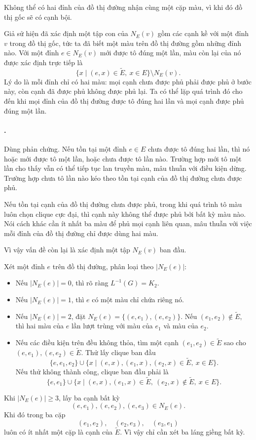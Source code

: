 \documentclass[11pt]{article}
\begin{document}
Không thể có hai đỉnh của đồ thị đường nhận cùng một cặp màu, vì khi đó đồ thị
gốc sẽ có cạnh bội.

Giả sử hiện đã xác định một tập con của \(N_E(v)\) gồm các cạnh kề với một
đỉnh \(v\) trong đồ thị gốc, tức ta đã biết một màu trên đồ thị đường gồm những
đỉnh nào. Với một đỉnh \(e\in N_E(v)\) mới được tô đúng một lần, màu còn lại
của nó được xác định trực tiếp là
\[
  \{x\mid (e,x)\in \widetilde E,\ x\in E\}\setminus N_E(v).
\]
Lý do là mỗi đỉnh chỉ có hai màu: mọi cạnh chưa được phủ phải được phủ ở bước
này, còn cạnh đã được phủ không được phủ lại. Ta có thể lặp quá trình đó cho
đến khi mọi đỉnh của đồ thị đường được tô đúng hai lần và mọi cạnh được phủ
đúng một lần.

\paragraph{.}
Dùng phản chứng. Nếu tồn tại một đỉnh \(e\in E\) chưa được tô đúng hai lần,
thì nó hoặc mới được tô một lần, hoặc chưa được tô lần nào. Trường hợp mới tô
một lần cho thấy vẫn có thể tiếp tục lan truyền màu, mâu thuẫn với điều kiện
dừng. Trường hợp chưa tô lần nào kéo theo tồn tại cạnh của đồ thị đường chưa
được phủ.

Nếu tồn tại cạnh của đồ thị đường chưa được phủ, trong khi quá trình tô màu
luôn chọn clique cực đại, thì cạnh này không thể được phủ bởi bất kỳ màu nào.
Nói cách khác cần ít nhất ba màu để phủ mọi cạnh liên quan, mâu thuẫn với việc
mỗi đỉnh của đồ thị đường chỉ được dùng hai màu.

Vì vậy vấn đề còn lại là xác định một tập \(N_E(v)\) ban đầu.

Xét một đỉnh \(e\) trên đồ thị đường, phân loại theo \(|N_E(e)|\):
\begin{itemize}
  \item Nếu \(|N_E(e)|=0\), thì rõ ràng \(L^{-1}(G)=K_2\).
  \item Nếu \(|N_E(e)|=1\), thì \(e\) có một màu chỉ chứa riêng nó.
  \item Nếu \(|N_E(e)|=2\), đặt \(N_E(e)=\{(e,e_1),(e,e_2)\}\). Nếu
  \((e_1,e_2)\notin \widetilde E\), thì hai màu của \(e\) lần lượt trùng với
  màu của \(e_1\) và màu của \(e_2\).
  \item Nếu các điều kiện trên đều không thỏa, tìm một cạnh
  \((e_1,e_2)\in \widetilde E\) sao cho
  \((e,e_1),(e,e_2)\in \widetilde E\). Thử lấy clique ban đầu
  \[
    \{e,e_1,e_2\}\cup
    \{x\mid (e,x),(e_1,x),(e_2,x)\in \widetilde E,\ x\in E\}.
  \]
  Nếu thử không thành công, clique ban đầu phải là
  \[
    \{e,e_1\}\cup
    \{x\mid (e,x),(e_1,x)\in \widetilde E,\ (e_2,x)\notin\widetilde E,\ x\in E\}.
  \]
\end{itemize}
Khi \(|N_E(e)|\ge 3\), lấy ba cạnh bất kỳ
\[
  (e,e_1),(e,e_2),(e,e_3)\in N_E(e).
\]
Khi đó trong ba cặp
\[
  (e_1,e_2),\quad (e_2,e_3),\quad (e_3,e_1)
\]
luôn có ít nhất một cặp là cạnh của \(\widetilde E\). Vì vậy chỉ cần xét ba
láng giềng bất kỳ.
\end{document}
